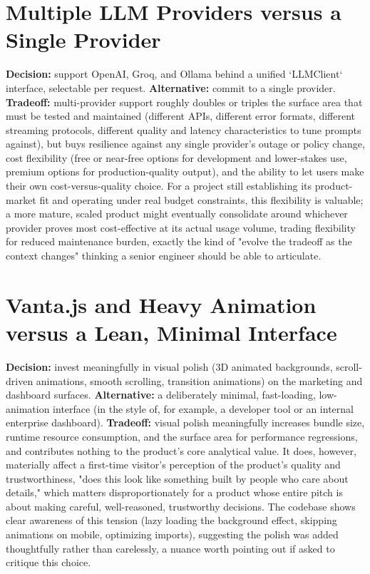 \documentclass[11pt,a4paper]{report}
\begin{document}
\section{Multiple LLM Providers versus a Single Provider}

\textbf{Decision:} support OpenAI, Groq, and Ollama behind a unified `LLMClient` interface, selectable per request.
\textbf{Alternative:} commit to a single provider.
\textbf{Tradeoff:} multi-provider support roughly doubles or triples the surface area that must be tested and maintained (different APIs, different error formats, different streaming protocols, different quality and latency characteristics to tune prompts against), but buys resilience against any single provider's outage or policy change, cost flexibility (free or near-free options for development and lower-stakes use, premium options for production-quality output), and the ability to let users make their own cost-versus-quality choice. For a project still establishing its product-market fit and operating under real budget constraints, this flexibility is valuable; a more mature, scaled product might eventually consolidate around whichever provider proves most cost-effective at its actual usage volume, trading flexibility for reduced maintenance burden, exactly the kind of "evolve the tradeoff as the context changes" thinking a senior engineer should be able to articulate.

\section{Vanta.js and Heavy Animation versus a Lean, Minimal Interface}

\textbf{Decision:} invest meaningfully in visual polish (3D animated backgrounds, scroll-driven animations, smooth scrolling, transition animations) on the marketing and dashboard surfaces.
\textbf{Alternative:} a deliberately minimal, fast-loading, low-animation interface (in the style of, for example, a developer tool or an internal enterprise dashboard).
\textbf{Tradeoff:} visual polish meaningfully increases bundle size, runtime resource consumption, and the surface area for performance regressions, and contributes nothing to the product's core analytical value. It does, however, materially affect a first-time visitor's perception of the product's quality and trustworthiness, "does this look like something built by people who care about details," which matters disproportionately for a product whose entire pitch is about making careful, well-reasoned, trustworthy decisions. The codebase shows clear awareness of this tension (lazy loading the background effect, skipping animations on mobile, optimizing imports), suggesting the polish was added thoughtfully rather than carelessly, a nuance worth pointing out if asked to critique this choice.
\end{document}
